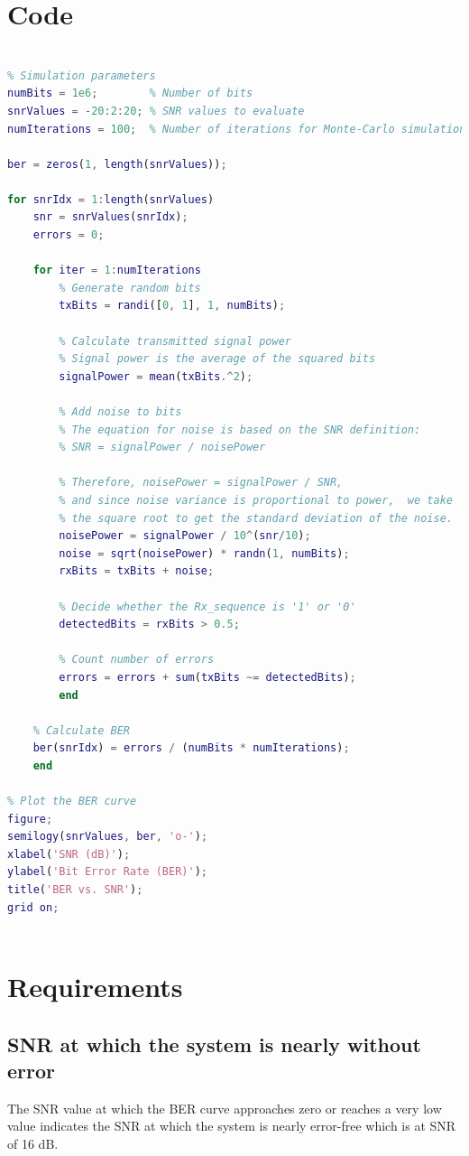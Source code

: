 \documentclass{article}
\begin{document}
	\section{Code}
	\begin{lstlisting}[language=MATLAB , caption=MATLAB code for Evaluating BER vs SNR, label=code:example]
			
% Simulation parameters
numBits = 1e6;        % Number of bits
snrValues = -20:2:20; % SNR values to evaluate
numIterations = 100;  % Number of iterations for Monte-Carlo simulation

ber = zeros(1, length(snrValues));

for snrIdx = 1:length(snrValues)
	snr = snrValues(snrIdx);
	errors = 0;

	for iter = 1:numIterations
		% Generate random bits
		txBits = randi([0, 1], 1, numBits);
		
		% Calculate transmitted signal power
		% Signal power is the average of the squared bits
		signalPower = mean(txBits.^2);
		
		% Add noise to bits
		% The equation for noise is based on the SNR definition: 
		% SNR = signalPower / noisePower
		
		% Therefore, noisePower = signalPower / SNR, 
		% and since noise variance is proportional to power,  we take 
		% the square root to get the standard deviation of the noise.
		noisePower = signalPower / 10^(snr/10);
		noise = sqrt(noisePower) * randn(1, numBits);
		rxBits = txBits + noise;
		
		% Decide whether the Rx_sequence is '1' or '0'
		detectedBits = rxBits > 0.5;
		
		% Count number of errors
		errors = errors + sum(txBits ~= detectedBits);
		end
	
	% Calculate BER
	ber(snrIdx) = errors / (numBits * numIterations);
	end

% Plot the BER curve
figure;
semilogy(snrValues, ber, 'o-');
xlabel('SNR (dB)');
ylabel('Bit Error Rate (BER)');
title('BER vs. SNR');
grid on;
			
		\end{lstlisting}
	
	\section{Requirements}
	\subsection{SNR at which the system is nearly without error}
	 The SNR value at which the BER curve approaches zero or reaches a very low value indicates the SNR at which the system is nearly error-free which is at SNR of 16 dB.
	 
\end{document}
